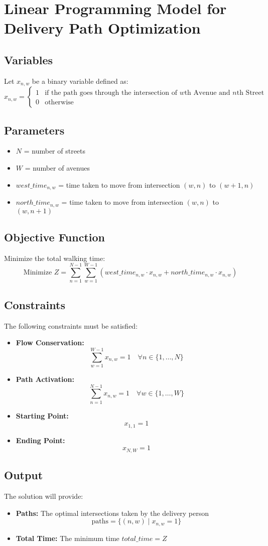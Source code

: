 \documentclass{article}
\begin{document}
\section*{Linear Programming Model for Delivery Path Optimization}

\subsection*{Variables}
Let \( x_{n,w} \) be a binary variable defined as:
\[
x_{n,w} = 
\begin{cases} 
1 & \text{if the path goes through the intersection of } w \text{th Avenue and } n \text{th Street} \\
0 & \text{otherwise}
\end{cases}
\]

\subsection*{Parameters}
\begin{itemize}
    \item \( N \) = number of streets
    \item \( W \) = number of avenues
    \item \( west\_time_{n,w} \) = time taken to move from intersection \( (w,n) \) to \( (w+1,n) \)
    \item \( north\_time_{n,w} \) = time taken to move from intersection \( (w,n) \) to \( (w,n+1) \)
\end{itemize}

\subsection*{Objective Function}
Minimize the total walking time:
\[
\text{Minimize } Z = \sum_{n=1}^{N-1} \sum_{w=1}^{W-1} (west\_time_{n,w} \cdot x_{n,w} + north\_time_{n,w} \cdot x_{n,w})
\]

\subsection*{Constraints}
The following constraints must be satisfied:
\begin{itemize}
    \item \textbf{Flow Conservation:} 
    \[
    \sum_{w=1}^{W-1} x_{n,w} = 1 \quad \forall n \in \{1, \ldots, N\}
    \]
    \item \textbf{Path Activation:}
    \[
    \sum_{n=1}^{N-1} x_{n,w} = 1 \quad \forall w \in \{1, \ldots, W\}
    \]
    \item \textbf{Starting Point:}
    \[
    x_{1,1} = 1
    \]
    \item \textbf{Ending Point:}
    \[
    x_{N,W} = 1
    \]
\end{itemize}

\subsection*{Output}
The solution will provide:
\begin{itemize}
    \item \textbf{Paths:} The optimal intersections taken by the delivery person 
    \[
    \text{paths} = \{(n,w) \mid x_{n,w} = 1\}
    \]
    \item \textbf{Total Time:} The minimum time \( total\_time = Z \)
\end{itemize}
\end{document}
